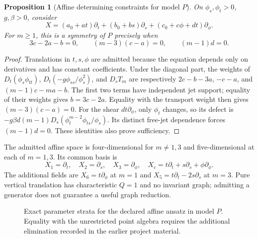 \documentclass[11pt,a4paper,oneside]{report}
\numberwithin{equation}{chapter}
\newtheorem{proposition}[theorem]{Proposition}
\begin{document}
\begin{proposition}[Affine determining constraints for model $P$]\label{prop:affine}
On $\phi_s,\phi_t>0$, $g,\beta>0$, consider
\begin{equation}
X=(a_0+at)\partial_t+(b_0+bs)\partial_s
 +(c_0+c\phi+dt)\partial_\phi.
\end{equation}
For $m\ge1$, this is a symmetry of $P$ precisely when
\begin{equation}\label{eq:affine}
3c-2a-b=0,\qquad (m-3)(c-a)=0,\qquad (m-1)d=0.
\end{equation}
\end{proposition}
\begin{proof}
Translations in $t,s,\phi$ are admitted because the equation depends only on derivatives and has constant coefficients. Under the diagonal part, the weights of $D_t(\phi_s\phi_{tt})$, $D_t(-g\phi_{ss}/\phi_s^2)$, and $D_sT_m$ are respectively
$2c-b-3a$, $-c-a$, and $(m-1)c-ma-b$.
The first two terms have independent jet support; equality of their weights gives $b=3c-2a$. Equality with the transport weight then gives $(m-3)(c-a)=0$. For the shear $dt\partial_\phi$, only $\phi_t$ changes, so its defect is
$-g\beta d(m-1)D_s(\phi_t^{m-2}\phi_{ts}/\phi_s)$. Its distinct free-jet dependence forces $(m-1)d=0$. These identities also prove sufficiency.\end{proof}
The admitted affine space is four-dimensional for $m\ne1,3$ and five-dimensional at each of $m=1,3$. Its common basis is
\begin{equation}
X_1=\partial_t,\quad X_2=\partial_s,\quad X_3=\partial_\phi,\quad
X_c=t\partial_t+s\partial_s+\phi\partial_\phi.
\end{equation}
The additional fields are $X_6=t\partial_\phi$ at $m=1$ and $X_5=t\partial_t-2s\partial_s$ at $m=3$. Pure vertical translation has characteristic $Q=1$ and no invariant graph; admitting a generator does not guarantee a useful graph reduction.

\begin{figure}[htbp]\centering
{}
\caption{Exact parameter strata for the declared affine ansatz in model $P$. Equality with the unrestricted point algebra requires the additional elimination recorded in the earlier project material.}\label{fig:strata}
\end{figure}
\end{document}
